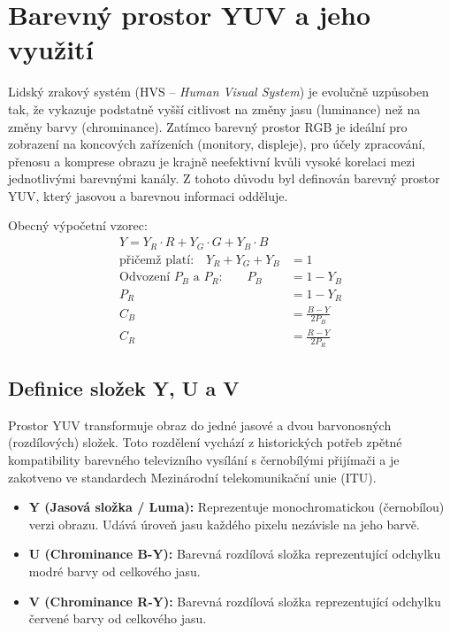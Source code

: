 \section{Barevný prostor YUV a jeho využití}

Lidský zrakový systém (HVS -- \textit{Human Visual System}) je evolučně uzpůsoben tak, že vykazuje podstatně vyšší citlivost na změny jasu (luminance) než na změny barvy (chrominance). Zatímco barevný prostor RGB je ideální pro zobrazení na koncových zařízeních (monitory, displeje), pro účely zpracování, přenosu a komprese obrazu je krajně neefektivní kvůli vysoké korelaci mezi jednotlivými barevnými kanály. Z tohoto důvodu byl definován barevný prostor YUV, který jasovou a barevnou informaci odděluje.

Obecný výpočetní vzorec:
\begin{equation}
\begin{aligned}
    Y = Y_R \cdot R + Y_G \cdot G + Y_B \cdot B \\
    \text{přičemž platí:} \quad Y_R + Y_G + Y_B &= 1 \\[10pt]
    \text{Odvození } P_B \text{ a } P_R \text{:} \qquad P_B &= 1 - Y_B \\
    P_R &= 1 - Y_R \\[10pt]
    C_B &= \frac{B - Y}{2P_B} \\
    C_R &= \frac{R - Y}{2P_R}
\end{aligned}
\end{equation}

\subsection{Definice složek Y, U a V}

Prostor YUV transformuje obraz do jedné jasové a dvou barvonosných (rozdílových) složek. Toto rozdělení vychází z historických potřeb zpětné kompatibility barevného televizního vysílání s černobílými přijímači a je zakotveno ve standardech Mezinárodní telekomunikační unie (ITU).

\begin{itemize}
    \item \textbf{Y (Jasová složka / Luma):} Reprezentuje monochromatickou (černobílou) verzi obrazu. Udává úroveň jasu každého pixelu nezávisle na jeho barvě.
    \item \textbf{U (Chrominance B-Y):} Barevná rozdílová složka reprezentující odchylku modré barvy od celkového jasu.
    \item \textbf{V (Chrominance R-Y):} Barevná rozdílová složka reprezentující odchylku červené barvy od celkového jasu.
\end{itemize}

